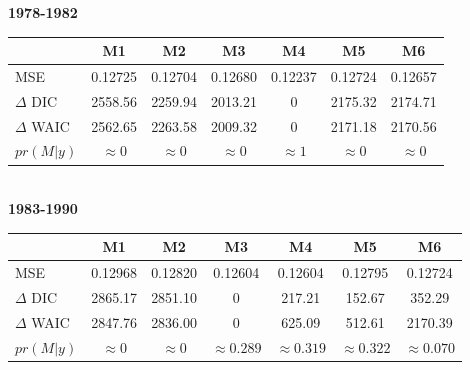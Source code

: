 \documentclass[ xcolor = pdftex, dvipsnames, table ]{beamer}
\begin{document}
%
%

\begin{frame}
\begin{center}
\textbf{1978-1982}
\hspace*{-0.4cm}
\begin{tabular}[c]{@{}lcccccc@{}}
\hline
& M1 & M2 & M3 & M4 & M5 & M6 \\ \hline
MSE & 0.12725 & 0.12704 & 0.12680 & 0.12237 & 0.12724 & 0.12657 \\ %
\(\Delta\) DIC & 2558.56 & 2259.94 & 2013.21 & 0 & 2175.32 & 2174.71 \\ %
\(\Delta\) WAIC & 2562.65 & 2263.58 & 2009.32 & 0 & 2171.18 & 2170.56 \\ %
\(pr(M|y)\) & \(\approx0\) & \(\approx0\) & \(\approx0\) & \(\approx1\) & \(\approx0\) & \(\approx0\) \\ \hline
\end{tabular}

$~$\\
\textbf{1983-1990}
\hspace*{-0.4cm}
\begin{tabular}[c]{@{}lcccccc@{}}
\hline
& M1 & M2 & M3 & M4 & M5 & M6 \\ \hline
MSE & 0.12968 & 0.12820 & 0.12604 & 0.12604 & 0.12795 & 0.12724 \\ %
\(\Delta\) DIC & 2865.17 & 2851.10 & 0 & 217.21 & 152.67 & 352.29 \\ %
\(\Delta\) WAIC & 2847.76 & 2836.00 & 0 & 625.09 & 512.61 & 2170.39 \\ %
\(pr(M|y)\) & $\approx0$ & $\approx0$ & $\approx0.289$ & $\approx0.319$ & $\approx0.322$ & $\approx0.070$ \\ \hline
\end{tabular}
\end{center}
\end{frame}
\end{document}

